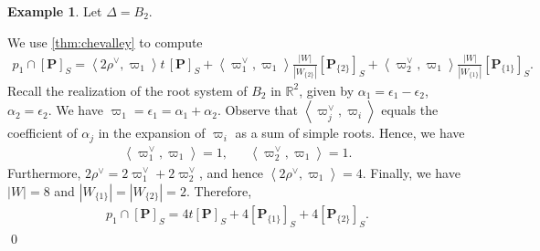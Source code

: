 \documentclass[10pt]{article}
\numberwithin{thm}{section}
\theoremstyle{definition}
\newtheorem{example}[thm]{Example}
\theoremstyle{remark}
\newcommand{\Pet}{\ensuremath{\mathbf{P}}}
\begin{document}
\begin{example}
\label{ex1}
Let $\Delta=B_2$.
\begin{center}
\end{center}
We use \cref{thm:chevalley} to compute 
\begin{align*}
p_1\cap[\Pet]_S=
\left\langle2\rho^\vee,\varpi_1\right\rangle t\,[\Pet]_S+
\left\langle\varpi^{\vee}_1 ,\varpi_1\right\rangle
\frac{|W|}{|W_{\{2\}}|}[\Pet_{\{2\}}]_S+
\left\langle\varpi^{\vee}_2,\varpi_1\right\rangle
\frac{|W|}{|W_{\{1\}}|}[\Pet_{\{1\}}]_S.
\end{align*}
Recall the realization of the root system of $B_2$ in $\mathbb R^2$,
given by $\alpha_1=\epsilon_1-\epsilon_2$, $\alpha_2=\epsilon_2$.
We have $\varpi_1=\epsilon_1=\alpha_1+\alpha_2$.
Observe that $\left\langle \varpi_j^\vee,\varpi_i\right\rangle$ equals the coefficient of $\alpha_j$ in the expansion of $\varpi_i$ as a sum of simple roots.
Hence, we have
\begin{align*}
\left\langle\varpi_1^\vee,\varpi_1\right\rangle=1,&&
\left\langle\varpi_2^\vee,\varpi_1\right\rangle=1.
\end{align*}
Furthermore, $2\rho^\vee=2\varpi_1^\vee+2\varpi_2^\vee$,
and hence $\left\langle 2\rho^\vee,\varpi_1\right\rangle=4$.
Finally, we have $|W|=8$ and $|W_{\{1\}}|=|W_{\{2\}}|=2$.
Therefore,
\begin{align*}
p_1\cap[\Pet]_S=4t[\Pet]_S+4[\Pet_{\{1\}}]_S+4[\Pet_{\{2\}}]_S.
\end{align*}
\qed
\end{example}
\end{document}
